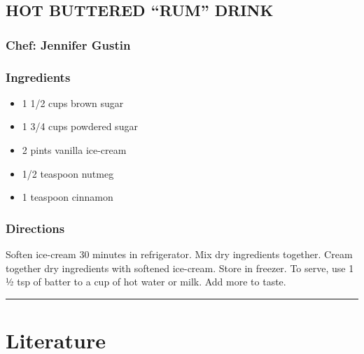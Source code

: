 \documentclass[
]{book}
\providecommand{\tightlist}{%
  \setlength{\itemsep}{0pt}\setlength{\parskip}{0pt}}
\begin{document}
\hypertarget{hot-buttered-rum-drink}{%
\section*{HOT BUTTERED ``RUM'' DRINK}\label{hot-buttered-rum-drink}}

\hypertarget{chef-jennifer-gustin-1}{%
\subsection*{Chef: Jennifer Gustin}\label{chef-jennifer-gustin-1}}

\hypertarget{ingredients-6}{%
\subsection*{Ingredients}\label{ingredients-6}}

\begin{itemize}
\tightlist
\item
  1 1/2 cups brown sugar
\item
  1 3/4 cups powdered sugar
\item
  2 pints vanilla ice-cream
\item
  1/2 teaspoon nutmeg
\item
  1 teaspoon cinnamon
\end{itemize}

\hypertarget{directions-6}{%
\subsection*{Directions}\label{directions-6}}

Soften ice-cream 30 minutes in refrigerator. Mix dry ingredients together.
Cream together dry ingredients with softened ice-cream.
Store in freezer. To serve, use 1 ½ tsp of batter to a cup of hot water or milk. Add more to taste.

\begin{center}\rule{0.5\linewidth}{0.5pt}\end{center}

\hypertarget{literature}{%
\chapter{Literature}\label{literature}}
\end{document}
